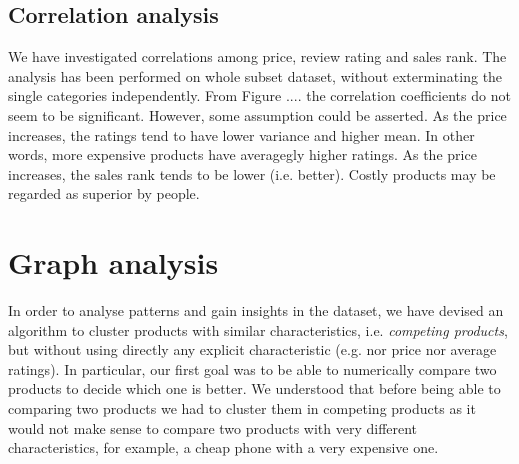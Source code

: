 \documentclass[11pt]{article}
\begin{document}
\subsection{Correlation analysis}
We have investigated correlations among price, review rating and sales rank. The analysis has been performed on whole subset dataset, without exterminating the single categories independently. 
From Figure .... the correlation coefficients do not seem to be significant. However, some assumption could be asserted. As the price increases, the ratings tend to have lower variance and higher mean. In other words, more expensive products have averagegly higher ratings.
As the price increases, the sales rank tends to be lower (i.e. better). Costly products may be regarded as superior by people. 

\section{Graph analysis}
In order to analyse patterns and gain insights in the dataset, we have devised an algorithm to cluster products with similar characteristics, i.e. \textit{competing products}, but without using directly any explicit characteristic (e.g. nor price nor average ratings). In particular, our first goal was to be able to numerically compare two products to decide which one is better. We understood that before being able to comparing two products we had to cluster them in competing products as it would not make sense to compare two products with very different characteristics, for example, a cheap phone with a very expensive one. 
\end{document}
